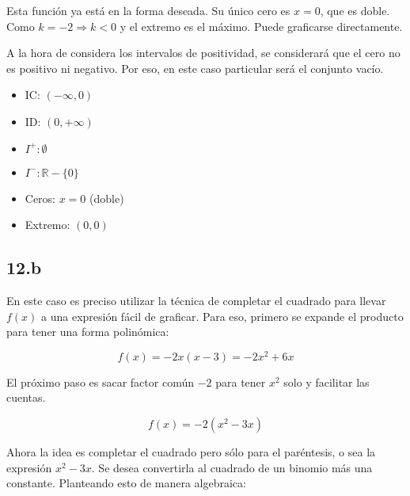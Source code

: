 \documentclass{article}
\newcommand{\figurex}[4]{\begin{figure}[ht] \caption{#1} \texttt{[image: \#3]} \centering \label{#4}\end{figure}}
\newcommand{\figurexnp}[4]{\afterpage{\figurex{#1}{#2}{#3}{#4}}}
\begin{document}
Esta función ya está en la forma deseada. Su único cero es $x = 0$, que es doble. Como $k = -2 \Rightarrow k < 0$ y el extremo es el máximo. Puede graficarse directamente. 

\figurexnp{Ejercicio 12a}{1.3}{../img/guide_01/ex_12a.png}{fig:12a}

A la hora de considera los intervalos de positividad, se considerará que el cero no es positivo ni negativo. Por eso, en este caso particular será el conjunto vacío.

\begin{itemize}

\item IC: $(-\infty, 0)$

\item ID: $(0, +\infty)$

\item $I^+: \emptyset$

\item $I^-: \mathbb{R} - \{ 0 \}$

\item Ceros: $x = 0$ (doble)

\item Extremo: $(0, 0)$

\end{itemize}

\subsection*{12.b}
\label{subsec:12.b}

En este caso es preciso utilizar la técnica de completar el cuadrado para llevar $f(x)$ a una expresión fácil de graficar. Para eso, primero se expande el producto para tener una forma polinómica:

\begin{equation}
f(x) = -2x (x-3) = -2x^2 + 6x
\end{equation}

El próximo paso es sacar factor común $-2$ para tener $x^2$ solo y facilitar las cuentas.

\begin{equation}
f(x) = -2 (x^2 -3x)
\end{equation}

Ahora la idea es completar el cuadrado pero sólo para el paréntesis, o sea la expresión $x^2 - 3x$. Se desea convertirla al cuadrado de un binomio más una constante. Planteando esto de manera algebraica:
\end{document}
